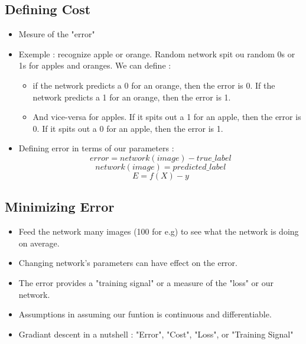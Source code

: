\documentclass[12pt,a4paper]{article}
\begin{document}
\subsection{Defining Cost}
\begin{itemize}
\item Mesure of the "error"
\item Exemple : recognize apple or orange. Random network spit ou random 0s or 1s for apples and oranges. We can define :
\begin{itemize}
\item if the network predicts a 0 for an orange, then the error is 0. If the network predicts a 1 for an orange, then the error is 1. 
\item And vice-versa for apples. If it spits out a 1 for an apple, then the error is 0. If it spits out a 0 for an apple, then the error is 1. 
\end{itemize}
\item Defining error in terms of our parameters :
\begin{equation} error = network(image) - true\_label 
\end{equation}
\begin{equation} network(image) = predicted\_label
\end{equation}
\begin{equation} E = f(X) - y
\end{equation}
\end{itemize}
\subsection{Minimizing Error}
\begin{itemize}
\item Feed the network many images (100 for e.g) to see what the network is doing on average.
\item Changing network's parameters can have effect on the error.
\item The error provides a "training signal" or a measure of the "loss" or our network.
\item Assumptions in assuming our funtion is continuous and differentiable. 
\item Gradiant descent in a nutshell : "Error", "Cost", "Loss", or "Training Signal"
\end{itemize}
\end{document}
